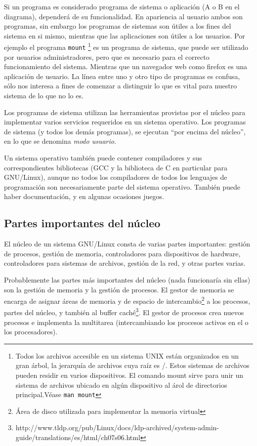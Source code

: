 \documentclass[12pt]{article}
\begin{document}
Si un programa es considerado programa de sistema o aplicación 
(A o B en el diagrama), dependerá de su funcionalidad. En apariencia al 
usuario ambos son programas, sin embargo los programas de sistemas son 
útiles a los fines del sistema en si mismo, mientras que las aplicaciones
son útiles a los usuarios. Por ejemplo el programa \texttt{mount} 
\footnote{ Todos los archivos accesible en un sistema UNIX están 
organizados en 
un gran árbol, la jerarquía de archivos cuya raíz es /. Estos 
sistemas de archivos pueden residir en varios dispositivos. El 
comando mount sirve para unir un sistema de archivos ubicado en algún 
dispositivo al árol de directorios principal.Véase \texttt{man mount}}
es un programa de sistema, que puede ser 
utilizado por usuarios administradores, pero que es necesario para el
correcto funcionamiento del sistema. Mientras que un navegador web como 
firefox es una aplicación de usuario. La línea entre uno y otro tipo de 
programas es confusa, sólo nos interesa a fines de comenzar a distinguir
lo que es vital para nuestro sistema de lo que no lo es.  

Los programas de sistema utilizan las herramientas provistas por el
núcleo para implementar varios servicios requeridos en un sistema 
operativo. Los programas de sistema (y todos los demás programas), se 
ejecutan ``por encima del núcleo'', en lo que se denomina 
\textit{modo usuario}. 

Un sistema operativo también puede contener compiladores y sus
correspondientes bibliotecas (GCC y la biblioteca de C en particular para
GNU/Linux), aunque no todos los compiladores de todos los lenguajes de
programación son necesariamente parte del sistema operativo. También 
puede haber documentación, y en algunas ocasiones juegos. 

\subsection{Partes importantes del núcleo}

El núcleo de un sistema GNU/Linux consta de varias partes importantes:
gestión de procesos, gestión de memoria,  controladores para 
dispositivos de hardware, controladores para sistemas de archivos, 
gestión de la red, y otras partes varias. 

 Probablemente las partes más importantes del núcleo (nada funcionaría sin
ellas) son la gestión de memoria y la gestión de procesos. El gestor de 
memoria se encarga de asignar áreas de memoria y de espacio de 
intercambio\footnote{Área de disco utilizada para implementar la memoria 
virtual} a los procesos, partes del núcleo, y también al buffer caché\footnote{http://www.tldp.org/pub/Linux/docs/ldp-archived/system-admin-guide/translations/es/html/ch07s06.html}. El gestor de procesos crea nuevos 
procesos e implementa la multitarea (intercambiando los procesos activos 
en el o los procesadores).
\end{document}
